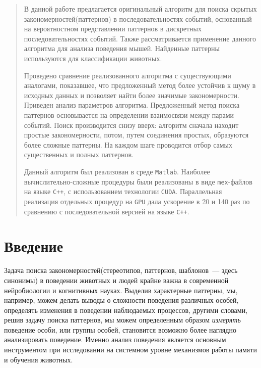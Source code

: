 \documentclass[12pt,fсeqn]{article}
\begin{document}
\newcommand{\evt}{ {\bf e} }
\newcommand{\pat}{ {\bf P} }
\newcommand{\Var}{\mathsf{var}}
\newcommand{\Erf}{\mathsf{erf}}

\begin{abstract}
В данной работе предлагается оригинальный алгоритм для поиска скрытых закономерностей(паттернов) в последовательностях событий,
основанный на вероятностном представлении паттернов в дискретных последовательностях событий. Также рассматривается 
применение данного алгоритма для анализа поведения мышей. Найденные паттерны используются для классификации
животных.


Проведено сравнение реализованного алгоритма с существующими аналогами, показавшее, что предложенный метод более устойчив к шуму в 
исходных данных и позволяет найти более значимые закономерности.
Приведен анализ параметров алгоритма. Предложенный метод поиска паттернов основывается на определении взаимосвязи между парами событий. 
Поиск производится снизу вверх: алгоритм сначала находит простые
закономерности, потом, путем соединения простых, образуются более сложные паттерны. 
На каждом шаге проводится отбор самых существенных и полных паттернов.

Данный алгоритм был реализован в среде \verb!Matlab!. Наиболее вычислительно-сложные процедуры были реализованы в виде 
\verb!mex!-файлов на языке \verb!C++!, с использованием технологии \verb!CUDA!. Параллельная реализация отдельных процедур
на \verb!GPU! дала ускорение в 20 и 140 раз по сравнению с последовательной версией на языке \verb!C++!.
\end{abstract}
\newpage
\tableofcontents
\newpage

\section{Введение}
Задача поиска закономерностей(стереотипов, паттернов, шаблонов~--- здесь синонимы) в поведении животных и людей крайне важна
в современной нейробиологии и когнитивных науках. Выделив характерные паттерны, мы, например, можем делать выводы
о сложности поведения различных особей, определять изменения в поведении наблюдаемых процессов,
другими словами, решив задачу поиска паттернов, мы можем определенным образом {\em измерять} поведение особи, или
группы особей, становится возможно более наглядно анализировать поведение.
Именно анализ поведения является основным инструментом при исследовании на системном уровне механизмов работы памяти и обучения животных.
\end{document}

